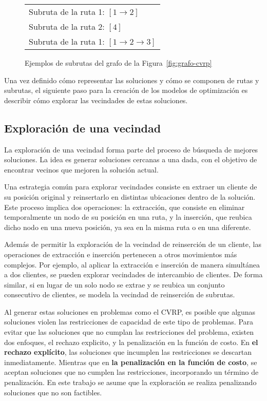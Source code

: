 \documentclass[12pt]{report}
\begin{document}
	\begin{figure}[h!]
		\centering
		\begin{tabular}{l}
			Subruta de la ruta 1: $[1 \rightarrow 2]$\\
			Subruta de la ruta 2: $[4]$\\
			Subruta de la ruta 1: $[1 \rightarrow2 \rightarrow3]$
		\end{tabular}
		\caption{Ejemplos de subrutas del grafo de la Figura~\ref{fig:grafo-cvrp}}
		\label{fig:subrutas-cvrp}
	\end{figure}

	Una vez definido cómo representar las soluciones y cómo se componen de rutas y subrutas, el siguiente paso para la creación de los modelos de optimización es describir cómo explorar las vecindades de estas soluciones.

	\subsection{Exploración de una vecindad}
	\label{sec:Exploracion de una vecindad}

	La exploración de una vecindad forma parte del proceso de búsqueda de mejores soluciones. La idea es generar soluciones cercanas a una dada, con el objetivo de encontrar vecinos que mejoren la solución actual.

	Una estrategia común para explorar vecindades consiste en extraer un cliente de su posición original y reinsertarlo en distintas ubicaciones dentro de la solución. Este proceso implica dos operaciones: la extracción, que consiste en eliminar temporalmente un nodo de su posición en una ruta, y la inserción, que reubica dicho nodo en una nueva posición, ya sea en la misma ruta o en una diferente.

	Además de permitir la exploración de la vecindad de reinserción de un cliente, las operaciones de extracción e inserción pertenecen a otros movimientos más complejos. Por ejemplo, al aplicar la extracción e inserción de manera simultánea a dos clientes, se pueden explorar vecindades de intercambio de clientes. De forma similar, si en lugar de un solo nodo se extrae y se reubica un conjunto consecutivo de clientes, se modela la vecindad de reinserción de subrutas.

	Al generar estas soluciones en problemas como el CVRP, es posible que algunas soluciones violen las restricciones de capacidad de este tipo de problemas. Para evitar que las soluciones que no cumplan las restricciones del problema, existen dos enfoques, el rechazo explicito, y la penalización en la función de costo. En \textbf{el rechazo explícito}, las soluciones que incumplen las restricciones se descartan inmediatamente. Mientras que en \textbf{la penalización en la función de costo}, se aceptan soluciones que no cumplen las restricciones, incorporando un término de penalización. En este trabajo se asume que la exploración se realiza penalizando soluciones que no son factibles.
\end{document}
